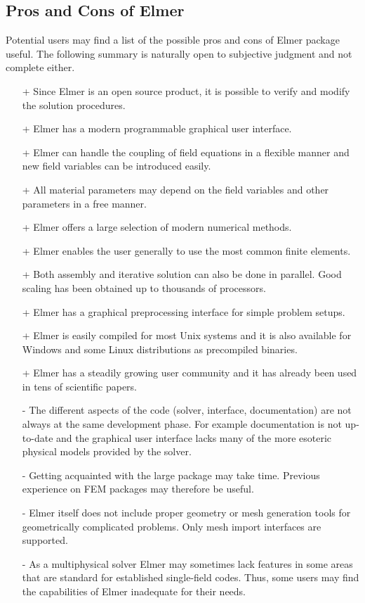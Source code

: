 \subsection*{Pros and Cons of Elmer}
Potential users may find a list of the possible pros and cons of Elmer package useful.
The following summary is naturally open to subjective judgment and not complete either.
\begin{itemize}
\item[+] Since Elmer is an open source product, it is possible to verify and modify the solution procedures.
\item[+] Elmer has a modern programmable graphical user interface.
\item[+] Elmer can handle the coupling of field equations in a flexible manner and new field variables can be 
  introduced easily.
\item[+] All material parameters may depend on the field variables and other parameters in a free manner.
\item[+] Elmer offers a large selection of modern numerical methods.
\item[+] Elmer enables the user generally to use the most common finite elements.
\item[+] Both assembly and iterative solution can also be done in parallel. Good scaling has been obtained up to thousands of processors. 
\item[+] Elmer has a graphical preprocessing interface for simple problem setups.
\item[+] Elmer is easily compiled for most Unix systems and it is also available
  for Windows and some Linux distributions as precompiled binaries.
\item[+] Elmer has a steadily growing user community and it has already been used in tens of 
   scientific papers. 
\item[-] The different aspects of the code (solver, interface, documentation) are not always at the same
development phase. For example documentation is not up-to-date and the graphical user interface lacks many of the more esoteric
physical models provided by the solver. 
\item[-] Getting acquainted with the large package may take time. Previous experience on FEM packages 
  may therefore be useful.
\item[-] Elmer itself does not include proper geometry or mesh generation tools for geometrically 
  complicated problems. Only mesh import interfaces are supported.
\item[-] As a multiphysical solver Elmer may sometimes lack features in some areas that are standard for
	established single-field codes. 
         Thus, some users may find the capabilities of Elmer inadequate for their needs. 
\end{itemize}






